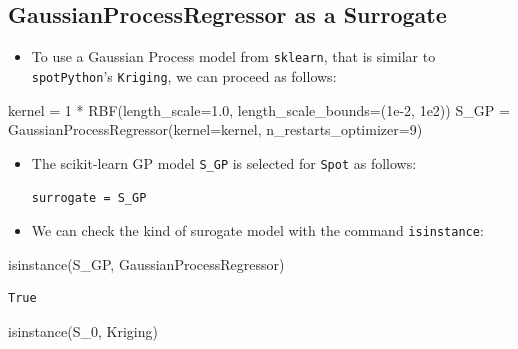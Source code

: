 \documentclass[
  letterpaper,
  DIV=11,
  numbers=noendperiod]{scrreprt}
\newenvironment{Shaded}{\begin{snugshade}}{\end{snugshade}}
\newcommand{\BuiltInTok}[1]{\textcolor[rgb]{0.00,0.23,0.31}{#1}}
\newcommand{\DecValTok}[1]{\textcolor[rgb]{0.68,0.00,0.00}{#1}}
\newcommand{\FloatTok}[1]{\textcolor[rgb]{0.68,0.00,0.00}{#1}}
\newcommand{\NormalTok}[1]{\textcolor[rgb]{0.00,0.23,0.31}{#1}}
\newcommand{\OperatorTok}[1]{\textcolor[rgb]{0.37,0.37,0.37}{#1}}
\providecommand{\tightlist}{%
  \setlength{\itemsep}{0pt}\setlength{\parskip}{0pt}}\usepackage{longtable,booktabs,array}
\begin{document}
\subsection{GaussianProcessRegressor as a
Surrogate}\label{gaussianprocessregressor-as-a-surrogate}

\begin{itemize}
\tightlist
\item
  To use a Gaussian Process model from \texttt{sklearn}, that is similar
  to \texttt{spotPython}'s \texttt{Kriging}, we can proceed as follows:
\end{itemize}

\begin{Shaded}
\begin{Highlighting}[]
\NormalTok{kernel }\OperatorTok{=} \DecValTok{1} \OperatorTok{*}\NormalTok{ RBF(length\_scale}\OperatorTok{=}\FloatTok{1.0}\NormalTok{, length\_scale\_bounds}\OperatorTok{=}\NormalTok{(}\FloatTok{1e{-}2}\NormalTok{, }\FloatTok{1e2}\NormalTok{))}
\NormalTok{S\_GP }\OperatorTok{=}\NormalTok{ GaussianProcessRegressor(kernel}\OperatorTok{=}\NormalTok{kernel, n\_restarts\_optimizer}\OperatorTok{=}\DecValTok{9}\NormalTok{)}
\end{Highlighting}
\end{Shaded}

\begin{itemize}
\item
  The scikit-learn GP model \texttt{S\_GP} is selected for \texttt{Spot}
  as follows:

  \texttt{surrogate\ =\ S\_GP}
\item
  We can check the kind of surogate model with the command
  \texttt{isinstance}:
\end{itemize}

\begin{Shaded}
\begin{Highlighting}[]
\BuiltInTok{isinstance}\NormalTok{(S\_GP, GaussianProcessRegressor) }
\end{Highlighting}
\end{Shaded}

\begin{verbatim}
True
\end{verbatim}

\begin{Shaded}
\begin{Highlighting}[]
\BuiltInTok{isinstance}\NormalTok{(S\_0, Kriging)}
\end{Highlighting}
\end{Shaded}
\end{document}
